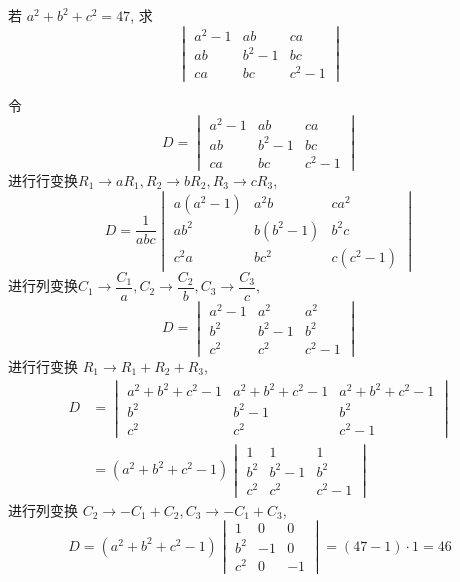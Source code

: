 \begin{questions}
    \question 若 $a^2+b^2+c^2=47$, 求
    \[
    \begin{vmatrix}
    a^2-1 & ab & ca \\
    ab & b^2-1 & bc \\
    ca & bc & c^2-1
    \end{vmatrix}
    \]
    \begin{solution}
        令
        \[
        D=\begin{vmatrix}
        a^2-1 & ab & ca \\
        ab & b^2-1 & bc \\
        ca & bc & c^2-1
        \end{vmatrix}
        \]
        进行行变换$R_1\to aR_1, R_2\to bR_2, R_3\to cR_3$,
        \[
        D=\frac{1}{abc}\begin{vmatrix}
        a(a^2-1) & a^2b & ca^2 \\
        ab^2 & b(b^2-1) & b^2c \\
        c^2a & bc^2 & c(c^2-1)
        \end{vmatrix}
        \]
        进行列变换$C_1\to \dfrac{C_1}{a}, C_2\to \dfrac{C_2}{b}, C_3\to \dfrac{C_3}{c}$,
        \[
        D=\begin{vmatrix}
        a^2-1 & a^2 & a^2 \\
        b^2 & b^2-1 & b^2 \\
        c^2 & c^2 & c^2-1
        \end{vmatrix}
        \]
        进行行变换 $R_1\to R_1+R_2+R_3$,
        \begin{align*}
            D&=\begin{vmatrix}
            a^2+b^2+c^2-1 & a^2+b^2+c^2-1 & a^2+b^2+c^2-1 \\
            b^2 & b^2-1 & b^2 \\
            c^2 & c^2 & c^2-1
            \end{vmatrix}\\
            &=(a^2+b^2+c^2-1)
            \begin{vmatrix}
            1 & 1 & 1 \\
            b^2 & b^2-1 & b^2 \\
            c^2 & c^2 & c^2-1
            \end{vmatrix}
        \end{align*}
        进行列变换 $C_2\to -C_1+C_2,C_3\to -C_1+C_3$,
        \[
        D=(a^2+b^2+c^2-1) 
        \begin{vmatrix}
        1 & 0 & 0 \\
        b^2 & -1 & 0 \\
        c^2 & 0 & -1
        \end{vmatrix}
        =(47-1)\cdot1=46
        \]
    \end{solution}


\end{questions}

